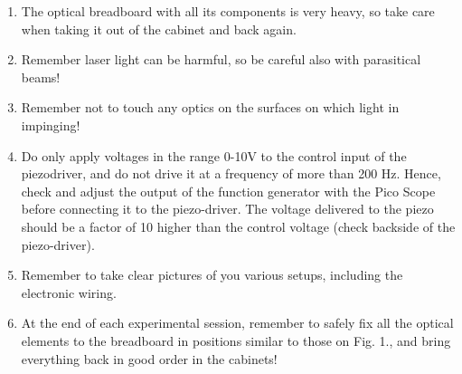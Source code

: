 \documentclass[a4paper, oneside, onecolumn, 11pt]{memoir}
\begin{document}
 \renewcommand{\labelenumi}{\Roman{enumi}}
\begin{enumerate}
    \item The optical breadboard with all its components is very heavy, so take care when taking it out of the cabinet and back again.
    \item Remember laser light can be harmful, so be careful also with parasitical beams!
    \item Remember not to touch any optics on the surfaces on which light in impinging!  
    \item Do only apply voltages in the range 0-10V to the control input of the piezodriver,
        and do not drive it at a frequency of more than 200 Hz. Hence, check and 
        adjust the output of the function generator with the Pico Scope before  
        connecting it to the piezo-driver. The voltage delivered to the piezo should be a   
        factor of 10 higher than the control voltage (check backside of the piezo-driver).
    \item Remember to take clear pictures of you various setups, including the 
        electronic wiring. 
    \item At the end of each experimental session, remember to safely fix all the optical 
        elements to the breadboard in positions similar to those on Fig. 1., and bring   
        everything back in good order in the cabinets!

\end{enumerate}
\end{document}
